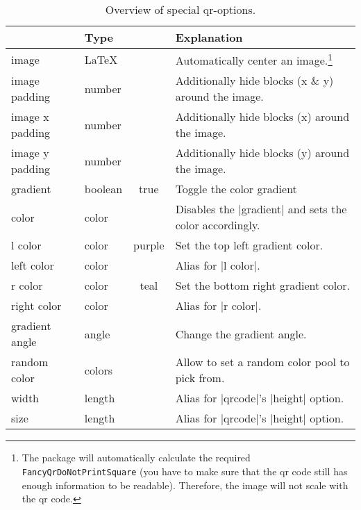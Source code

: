 \documentclass[parskip=half,english,numbers=noenddot,footnotes=nomultiple,oneside]{scrartcl}
\def\ltx#1{\lstinline/#1/}
\begin{document}
\begin{savenotes}
\begin{table}
	\centering\begin{tabular}{>{\ttfamily}ll>{\ttfamily}cp{.5\linewidth}}
		\toprule
		\multicolumn{1}{l}{Option} & Type & \multicolumn{1}{c}{Default} & Explanation \\
		\midrule
		image           & \LaTeX   &          & Automatically center an image.\footnote{The package will automatically calculate the required \ltx{\\FancyQrDoNotPrintSquare} (you have to make sure that the qr code still has enough information to be readable). Therefore, the image will not scale with the qr code.} \\
		image padding   & number  &          & Additionally hide blocks (x \& y) around the image.          \\
		image x padding & number  &   0      & Additionally hide blocks (x) around the image.               \\
		image y padding & number  &   0      & Additionally hide blocks (y) around the image.               \\
		gradient        & boolean &   true   & Toggle the color gradient                                    \\
		color           & color   &          & Disables the |gradient| and sets the color accordingly.      \\
		l color         & color   & purple   & Set the top left gradient color.                             \\
		left color      & color   &          & Alias for |l color|.                                         \\
		r color         & color   &  teal    & Set the bottom right gradient color.                         \\
		right color     & color   &          & Alias for |r color|.                                         \\
		gradient angle  & angle   &  135     & Change the gradient angle.                                   \\
		random color    & colors  &          & Allow to set a random color pool to pick from.               \\
		width           & length  &          & Alias for |qrcode|'s |height| option.                        \\
		size            & length  &          & Alias for |qrcode|'s |height| option.                        \\
		\bottomrule
	\end{tabular}
	\caption{Overview of special qr-options.}
	\label{tbl:extra-keys}
\end{table}
\end{savenotes}
\end{document}

